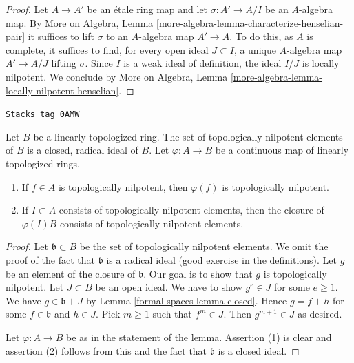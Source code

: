 \begin{proof}
Let $A \to A'$ be an \'etale ring map and let $\sigma : A' \to A/I$
be an $A$-algebra map. By More on Algebra, Lemma
\ref{more-algebra-lemma-characterize-henselian-pair} it suffices
to lift $\sigma$ to an $A$-algebra map $A' \to A$.
To do this, as $A$ is complete, it suffices to find,
for every open ideal $J \subset I$, a unique $A$-algebra map $A' \to A/J$
lifting $\sigma$. Since $I$ is a weak ideal of definition,
the ideal $I/J$ is locally nilpotent. We conclude by
More on Algebra, Lemma \ref{more-algebra-lemma-locally-nilpotent-henselian}.
\end{proof}

\begin{lemma}
\label{formal-spaces-lemma-topologically-nilpotent}
\href{https://stacks.math.columbia.edu/tag/0AMW}{\texttt{Stacks tag 0AMW}}

Let $B$ be a linearly topologized ring. The set of topologically nilpotent
elements of $B$ is a closed, radical ideal of $B$.
Let $\varphi : A \to B$ be a continuous map of linearly topologized rings.
\begin{enumerate}
\item If $f \in A$ is topologically nilpotent, then $\varphi(f)$ is
topologically nilpotent.
\item If $I \subset A$ consists of topologically nilpotent elements,
then the closure of $\varphi(I)B$ consists of topologically nilpotent
elements.
\end{enumerate}
\end{lemma}

\begin{proof}
Let $\mathfrak b \subset B$ be the set of topologically nilpotent elements.
We omit the proof of the fact that $\mathfrak b$ is a radical ideal
(good exercise in the definitions). Let $g$ be an element of the closure
of $\mathfrak b$. Our goal is to show that $g$ is topologically nilpotent.
Let $J \subset B$ be an open ideal. We have to show
$g^e \in J$ for some $e \geq 1$. We have $g \in \mathfrak b + J$
by Lemma \ref{formal-spaces-lemma-closed}. Hence $g = f + h$
for some $f \in \mathfrak b$ and $h \in J$. Pick $m \geq 1$ such that
$f^m \in J$. Then $g^{m + 1} \in J$ as desired.

\medskip\noindent
Let $\varphi : A \to B$ be as in the statement of the lemma.
Assertion (1) is clear and assertion (2) follows from this and
the fact that $\mathfrak b$ is a closed ideal.
\end{proof}


